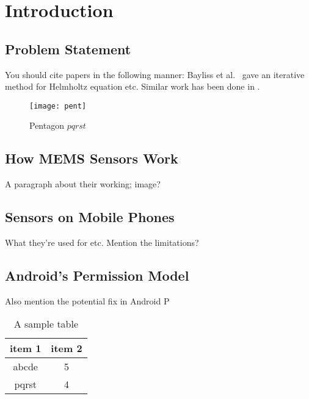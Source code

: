 \chapter{Introduction}

\section{Problem Statement}
\lipsum[1]

You should cite papers in the following manner:
Bayliss et al.~\cite{gyrophone} gave an iterative method for Helmholtz equation etc.
Similar work has been done in \cite{walnut, goespin}.

\begin{figure}[]
\begin{center}
\texttt{[image: pent]}
\caption{Pentagon $pqrst$}
\label{fig:pent}
\end{center}
\end{figure}

\section{How MEMS Sensors Work}
A paragraph about their working; image?

\section{Sensors on Mobile Phones}
What they're used for etc. Mention the limitations?

\section{Android's Permission Model}
Also mention the potential fix in Android P

\lipsum[2]

\begin{table}
\centering
\begin{tabular}{| c | c |}
\hline
{\bf item 1} & {\bf item 2} \\ \hline
%
abcde & 5 \\ \hline
%
pqrst & 4 \\ \hline
\end{tabular}
\caption{A sample table}
\label{table:1}
\end{table}
